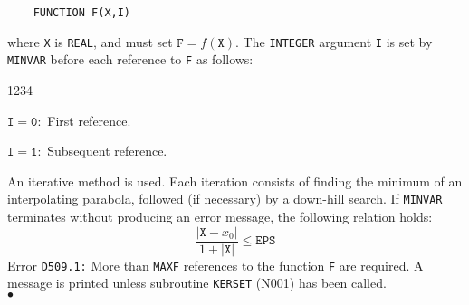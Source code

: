 \begin{verbatim}
    FUNCTION F(X,I)
\end{verbatim}
where {\tt X} is {\tt REAL}, and must set $\mathtt{F}=f(\mathtt{X})$.
The {\tt INTEGER} argument {\tt I} is set by {\tt MINVAR} before each
reference to {\tt F} as follows:
\begin{DLtt}{1234}
\item[] $\mathtt{I = 0:}$ \quad  First reference.
\item[] $\mathtt{I = 1:}$ \quad  Subsequent reference.
\end{DLtt}
\Method
An iterative method is used. Each iteration consists
of finding the minimum of an interpolating parabola, followed
(if necessary) by a down-hill search.
\newpage
\Accuracy
If {\tt MINVAR} terminates without producing an error message,
the following relation holds:
$$ \frac{|\mathtt{X} - x_0|}{1+|\mathtt{X}|} \leq \mathtt{EPS} $$
\Errorh
Error {\tt D509.1:}  More than {\tt MAXF} references to the function
{\tt F} are required. A message is printed unless subroutine
{\tt KERSET} (N001) has been called.
\\ $\bullet$
